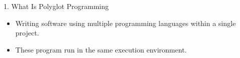 \begin{roundedbeamerblock}{1. What Is Polyglot Programming}

    \vspace{5mm}
    \begin{itemize}
        \item Writing software using multiple programming languages within a single project.
    \vspace{5mm}
        \item These program run in the same execution environment.
    \vspace{5mm}
    \end{itemize}

\end{roundedbeamerblock}
